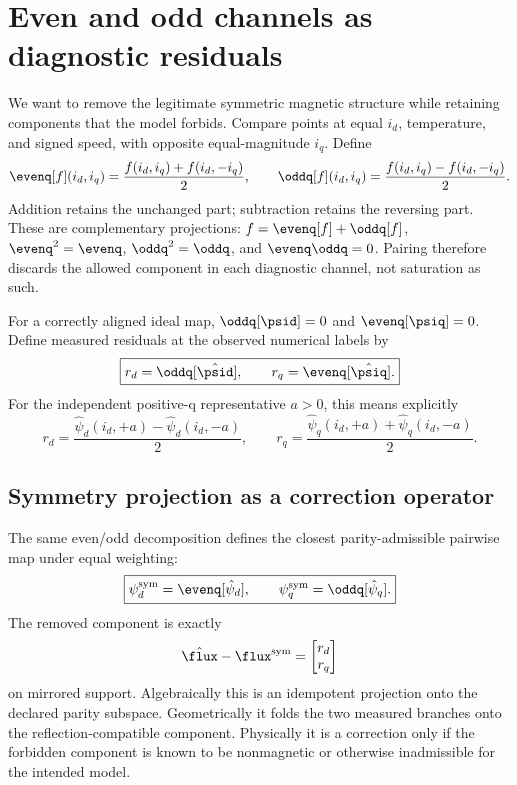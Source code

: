 \section{Even and odd channels as diagnostic residuals}
We want to remove the legitimate symmetric magnetic structure while retaining
components that the model forbids. Compare points at equal $i_d$, temperature,
and signed speed, with opposite equal-magnitude $i_q$. Define
\begin{equation}
 \evenq[f](i_d,i_q)=\frac{f(i_d,i_q)+f(i_d,-i_q)}{2},\qquad
 \oddq[f](i_d,i_q)=\frac{f(i_d,i_q)-f(i_d,-i_q)}{2}.
 \label{eq:parity-operators}
\end{equation}
Addition retains the unchanged part; subtraction retains the reversing part.
These are complementary projections: $f=\evenq[f]+\oddq[f]$,
$\evenq^2=\evenq$, $\oddq^2=\oddq$, and $\evenq\oddq=0$. Pairing therefore discards the
allowed component in each diagnostic channel, not saturation as such.


For a correctly aligned ideal map, $\oddq[\psid]=0$ and $\evenq[\psiq]=0$.
Define measured residuals at the observed numerical labels by
\begin{equation}
 \boxed{r_d=\oddq[\hat\psid],\qquad r_q=\evenq[\hat\psiq].}
 \label{eq:residuals}
\end{equation}
For the independent positive-q representative $a>0$, this means explicitly
\begin{equation}
 r_d=\frac{\hat\psi_d(i_d,+a)-\hat\psi_d(i_d,-a)}{2},\qquad
 r_q=\frac{\hat\psi_q(i_d,+a)+\hat\psi_q(i_d,-a)}{2}.
\end{equation}

\subsection{Symmetry projection as a correction operator}
The same even/odd decomposition defines the closest parity-admissible pairwise map under equal weighting:
\begin{equation}
 \boxed{\psi_d^{\rm sym}=\evenq[\hat\psi_d],\qquad
        \psi_q^{\rm sym}=\oddq[\hat\psi_q].}
 \label{eq:symmetry-projection}
\end{equation}
The removed component is exactly
\begin{equation}
 \hat\flux-\flux^{\rm sym}=\begin{bmatrix}r_d\\r_q\end{bmatrix}
\end{equation}
on mirrored support. Algebraically this is an idempotent projection onto the declared parity subspace. Geometrically it folds the two measured branches onto the reflection-compatible component. Physically it is a correction only if the forbidden component is known to be nonmagnetic or otherwise inadmissible for the intended model.

